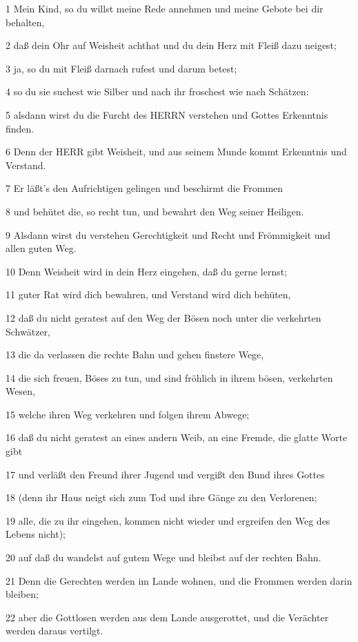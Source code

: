 \par 1 Mein Kind, so du willst meine Rede annehmen und meine Gebote bei dir behalten,
\par 2 daß dein Ohr auf Weisheit achthat und du dein Herz mit Fleiß dazu neigest;
\par 3 ja, so du mit Fleiß darnach rufest und darum betest;
\par 4 so du sie suchest wie Silber und nach ihr froschest wie nach Schätzen:
\par 5 alsdann wirst du die Furcht des HERRN verstehen und Gottes Erkenntnis finden.
\par 6 Denn der HERR gibt Weisheit, und aus seinem Munde kommt Erkenntnis und Verstand.
\par 7 Er läßt's den Aufrichtigen gelingen und beschirmt die Frommen
\par 8 und behütet die, so recht tun, und bewahrt den Weg seiner Heiligen.
\par 9 Alsdann wirst du verstehen Gerechtigkeit und Recht und Frömmigkeit und allen guten Weg.
\par 10 Denn Weisheit wird in dein Herz eingehen, daß du gerne lernst;
\par 11 guter Rat wird dich bewahren, und Verstand wird dich behüten,
\par 12 daß du nicht geratest auf den Weg der Bösen noch unter die verkehrten Schwätzer,
\par 13 die da verlassen die rechte Bahn und gehen finstere Wege,
\par 14 die sich freuen, Böses zu tun, und sind fröhlich in ihrem bösen, verkehrten Wesen,
\par 15 welche ihren Weg verkehren und folgen ihrem Abwege;
\par 16 daß du nicht geratest an eines andern Weib, an eine Fremde, die glatte Worte gibt
\par 17 und verläßt den Freund ihrer Jugend und vergißt den Bund ihres Gottes
\par 18 (denn ihr Haus neigt sich zum Tod und ihre Gänge zu den Verlorenen;
\par 19 alle, die zu ihr eingehen, kommen nicht wieder und ergreifen den Weg des Lebens nicht);
\par 20 auf daß du wandelst auf gutem Wege und bleibst auf der rechten Bahn.
\par 21 Denn die Gerechten werden im Lande wohnen, und die Frommen werden darin bleiben;
\par 22 aber die Gottlosen werden aus dem Lande ausgerottet, und die Verächter werden daraus vertilgt.

